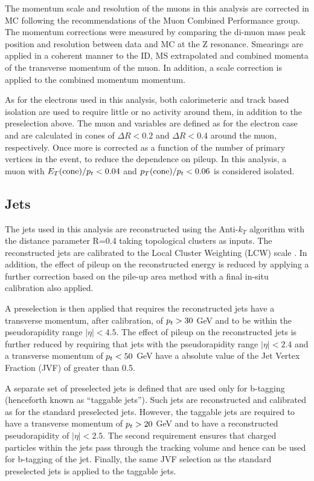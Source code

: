 The momentum scale and resolution of the muons in this analysis are
corrected in MC following the recommendations of the Muon Combined
Performance group. The momentum corrections were measured by comparing
the di-muon mass peak position and resolution between data and MC at
the Z resonance. Smearings are applied in a coherent manner to
the ID, MS extrapolated and combined momenta of the transverse
momentum of the muon. In addition, a scale correction is applied to
the combined momentum momentum.

As for the electrons used in this analysis, both calorimeteric and
track based isolation are used to require little or no activity around them,
in addition to the preselection above. The muon \etcone and \ptcone
variables are defined as for the electron case and are calculated
in cones of $\Delta R<0.2$ and $\Delta R<0.4$ around the muon, respectively. 
Once more \etcone is corrected as a function of the number of primary vertices in the
event, to reduce the dependence on pileup. In this analysis, a muon with
$E_{T}(\mathrm{cone})/p_{t}<0.04$ and $p_{T}(\mathrm{cone})/p_{t}<0.06$ is considered isolated.


\subsection{Jets}
\label{sec:presel:jet}

The jets used in this analysis are reconstructed using the Anti-$k_T$
algorithm \cite{AntiKT} with the distance parameter R=0.4 taking
topological clusters as inputs. The reconstructed jets are calibrated
to the Local Cluster Weighting (LCW) scale \cite{jetenergyscale}. In
addition, the effect of pileup on the reconstructed energy is reduced
by applying a further correction based on the pile-up area method with
a final in-situ calibration also applied.

A preselection is then applied that requires the reconstructed jets
have a transverse momentum, after calibration, of $p_{t} > 30$ GeV and
to be within the pseudorapidity range $|\eta| < 4.5$. The effect of pileup on
the reconstructed jets is further reduced by requiring that jets with
the pseudorapidity range $|\eta|<2.4$ and a transverse momentum of $p_{t} <
50$ GeV have a absolute value of the Jet Vertex Fraction (JVF) of greater than 0.5.

A separate set of preselected jets is defined that are used only for
b-tagging (henceforth known as ``taggable jets''). Such jets are
reconstructed and calibrated as for the standard preselected
jets. However, the taggable jets are required to have a transverse
momentum of $p_{t} > 20$ GeV and to have a reconstructed pseudorapidity
of $|\eta| < 2.5$. The second requirement ensures that charged
particles within the jets pass through the tracking volume and hence
can be used for b-tagging of the jet. Finally, the same JVF selection
as the standard preselected jets is applied to the taggable jets.

